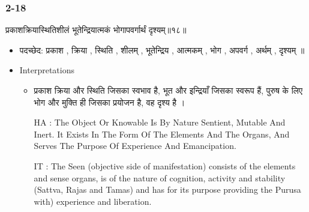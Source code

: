 \begin{frame}[fragile]\frametitle{2-18}
\begin{sanskrit}
प्रकाशक्रियास्थितिशीलं भूतेन्द्रियात्मकं भोगापवर्गार्थं दृश्यम्॥१८॥
\end{sanskrit}

	\begin{itemize}
	\item पदच्छेद: प्रकाश , क्रिया , स्थिति , शीलम् , भूतेन्द्रिय , आत्मकम् , भोग , अपवर्ग , अर्थम् , दृश्यम् ॥
	\item Interpretations
		\begin{itemize}
		\item प्रकाश क्रिया और स्थिति जिसका स्वभाव है, भूत और इन्द्रियाँ जिसका स्वरूप हैं, पुरुष के लिए भोग और मुक्ति ही जिसका प्रयोजन है, वह दृश्य है ।
		\item [HA]: The Object Or Knowable Is By Nature Sentient, Mutable And Inert. It Exists In The Form Of The Elements And The Organs, And Serves The Purpose Of Experience And Emancipation.
		\item [IT]: The Seen (objective side of manifestation) consists of the elements and sense organs, is of the nature of cognition, activity and stability (Sattva, Rajas and Tamas) and has for its purpose providing the Purusa with) experience and liberation.		
		\end{itemize}
	\end{itemize}
\end{frame}

